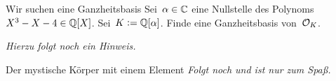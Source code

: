 \documentclass{uebblatt}
\begin{document}
\begin{aufgabe}{Wir suchen eine Ganzheitsbasis}
Sei~$\alpha \in \mathbb{C}$ eine Nullstelle des Polynoms~$X^3 - X - 4 \in \mathbb{Q}[X]$.
Sei~$K \vcentcolon= \mathbb{Q}[\alpha]$. Finde eine Ganzheitsbasis von~$\mathcal{O}_K$.

{\tiny\emph{Hierzu folgt noch ein Hinweis.}\par}
\end{aufgabe}

\begin{aufgabe*}{Der mystische Körper mit einem Element}
\emph{Folgt noch und ist nur zum Spaß.}
\end{aufgabe*}
\end{document}
